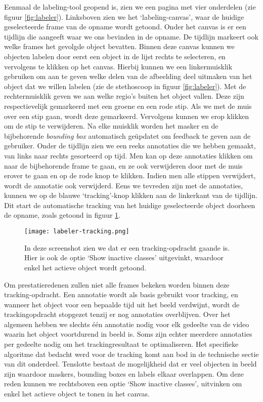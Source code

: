Eenmaal de labeling-tool geopend is, zien we een pagina met vier onderdelen (zie figuur \ref{fig:labeler}).
Linksboven zien we het `labeling-canvas', waar de huidige geselecteerde frame van de opname wordt getoond. Onder het canvas is er een tijdlijn die aangeeft waar we ons bevinden in de opname. De tijdlijn markeert ook welke frames het gevolgde object bevatten. 
Binnen deze canvas kunnen we objecten labelen door eerst een object in de lijst rechts te selecteren, en vervolgens te klikken op het canvas.
Hierbij kunnen we een linkermuisklik gebruiken om aan te geven welke delen van de afbeelding deel uitmaken van het object dat we willen labelen (zie de stethoscoop in figuur \ref{fig:labeler}). Met de rechtermuisklik geven we aan welke regio's buiten het object vallen.
Deze zijn respectievelijk gemarkeerd met een groene en een rode stip. Als we met de muis over een stip gaan, wordt deze gemarkeerd. Vervolgens kunnen we erop klikken om de stip te verwijderen.
Na elke muisklik worden het masker en de bijbehorende \textit{bounding box} automatisch geüpdatet om feedback te geven aan de gebruiker.
Onder de tijdlijn zien we een reeks annotaties die we hebben gemaakt, van links naar rechts gesorteerd op tijd. Men kan op deze annotaties klikken om naar de bijbehorende frame te gaan, en ze ook verwijderen door met de muis erover te gaan en op de rode knop te klikken.
Indien men alle stippen verwijdert, wordt de annotatie ook verwijderd.
Eens we tevreden zijn met de annotaties, kunnen we op de blauwe `tracking'-knop klikken aan de linkerkant van de tijdlijn.
Dit start de automatische tracking van het huidige geselecteerde object doorheen de opname, zoals getoond in figuur \ref{fig:labeler-tracking}. 

\begin{figure}[H]
  \centering
  \texttt{[image: labeler-tracking.png]}
  \caption[]{\label{fig:labeler-tracking} In deze screenshot zien we dat er een tracking-opdracht gaande is. Hier is ook de optie `Show inactive classes' uitgevinkt, waardoor enkel het actieve object wordt getoond. }
\end{figure}

Om prestatieredenen zullen niet alle frames bekeken worden binnen deze tracking-opdracht. Een annotatie wordt als basis gebruikt voor tracking, en wanneer het object voor een bepaalde tijd uit het beeld verdwijnt, wordt de trackingopdracht stopgezet tenzij er nog annotaties overblijven.
Over het algemeen hebben we slechts één annotatie nodig voor elk gedeelte van de video waarin het object voortdurend in beeld is. Soms zijn echter meerdere annotaties per gedeelte nodig om het trackingresultaat te optimaliseren.
Het specifieke algoritme dat bedacht werd voor de tracking komt aan bod in de technische sectie van dit onderdeel.
Tenslotte bestaat de mogelijkheid dat er veel objecten in beeld zijn waardoor maskers, bounding boxes en labels elkaar overlappen. Om deze reden kunnen we rechtsboven een optie `Show inactive classes', uitvinken om enkel het actieve object te tonen in het canvas.

